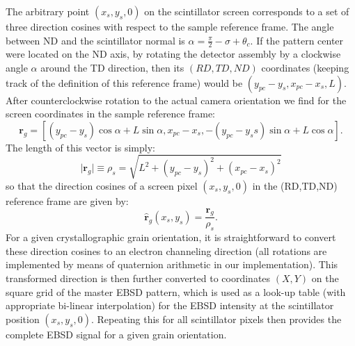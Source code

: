 \documentclass[DIV=calc, paper=letter, fontsize=11pt]{scrartcl}	 %
\begin{document}
The arbitrary point $(x_s,y_s,0)$ on the scintillator screen corresponds to a set of three direction cosines 
with respect to the sample reference frame.   The angle between ND and the scintillator normal is $\alpha=\frac{\pi}{2}-\sigma+\theta_c$.
If the pattern center were located on the ND axis, by rotating the detector assembly by a clockwise angle $\alpha$ around
the TD direction, then its $(RD,TD,ND)$ coordinates (keeping track of the definition of this reference frame) 
would be $(y_{pc}-y_s,x_{pc}-x_s,L)$.  After counterclockwise rotation to the actual camera orientation we 
find for the screen coordinates in the sample reference frame:
\[
	\mathbf{r}_g = \left[ (y_{pc}-y_s)\cos\alpha+L\sin\alpha, x_{pc}-x_s, -(y_{pc}-y_ss)\sin\alpha+L\cos\alpha\right].
\]
The length of this vector is simply:
\[
	\vert \mathbf{r}_g\vert \equiv \rho_s = \sqrt{L^2+(y_{pc}-y_s)^2 + (x_{pc}-x_s)^2}
\]
so that the direction cosines of a screen pixel $(x_s,y_s,0)$ in the (RD,TD,ND) reference frame are given by:
\begin{equation}
	\hat{\mathbf{r}}_g(x_s,y_s) = \frac{\mathbf{r}_g}{\rho_s}.\label{eq:dc}
\end{equation}
For a given crystallographic grain orientation, it is straightforward to convert these
direction cosines to an electron channeling direction (all rotations are implemented by means of quaternion arithmetic in our
implementation).  This transformed direction is then further converted
to coordinates $(X,Y)$ on the square grid of the master EBSD pattern, which is 
used as a look-up table (with appropriate  bi-linear interpolation) for the EBSD intensity at the scintillator
position $(x_s,y_s,0)$.   Repeating this for all scintillator pixels then provides the complete EBSD signal for a given grain orientation.
\end{document}
